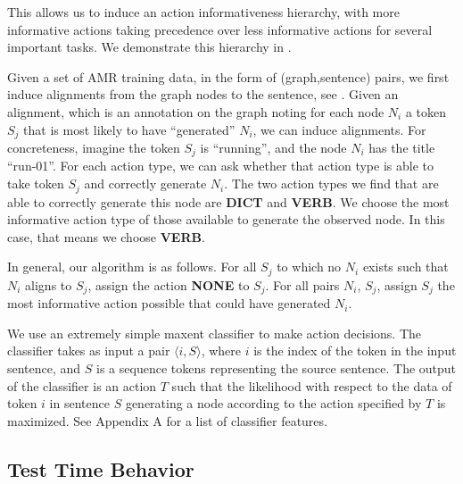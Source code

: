 \documentclass[11pt]{article}
\begin{document}

This allows us to induce an action informativeness hierarchy, with more informative actions taking precedence over less informative actions for several important tasks. We demonstrate this hierarchy in .


Given a set of AMR training data, in the form of (graph,sentence) pairs, we first induce alignments from the graph nodes to the sentence, see . Given an alignment, which is an annotation on the graph noting for each node $N_i$ a token $S_j$ that is most likely to have ``generated'' $N_i$, we can induce alignments. For concreteness, imagine the token $S_j$ is ``running'', and the node $N_i$ has the title ``run-01''. For each action type, we can ask whether that action type is able to take token $S_j$ and correctly generate $N_i$. The two action types we find that are able to correctly generate this node are \textbf{DICT} and \textbf{VERB}. We choose the most informative action type of those available to generate the observed node. In this case, that means we choose \textbf{VERB}.

In general, our algorithm is as follows. For all $S_j$ to which no $N_i$ exists such that $N_i$ aligns to $S_j$, assign the action \textbf{NONE} to $S_j$. For all pairs $N_i$, $S_j$, assign $S_j$ the most informative action possible that could have generated $N_i$. 


We use an extremely simple maxent classifier to make action decisions. The classifier takes as input a pair $\langle i, S \rangle$, where $i$ is the index of the token in the input sentence, and $S$ is a sequence tokens representing the source sentence. The output of the classifier is an action $T$ such that the likelihood with respect to the data of token $i$ in sentence $S$ generating a node according to the action specified by $T$ is maximized. See Appendix A for a list of classifier features.


\subsection{Test Time Behavior}
\end{document}
